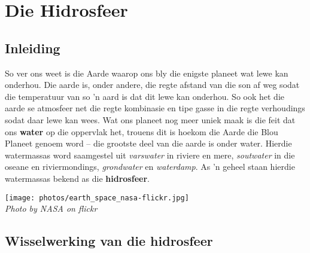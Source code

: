          \chapter{Die Hidrosfeer}

    \section{Inleiding}
            \nopagebreak
\begin{minipage}{.7\textwidth}
So ver ons weet is die Aarde waarop ons bly die enigste planeet wat lewe kan onderhou. Die aarde is, onder andere, die regte afstand van die son af weg sodat die temperatuur van so  'n aard is dat dit lewe kan onderhou. So ook het die aarde se atmosfeer net die regte kombinasie en tipe gasse in die regte verhoudings sodat daar lewe kan wees. Wat ons planeet nog meer uniek maak is die feit dat ons \textbf{water} op die oppervlak het, trouens dit is hoekom die Aarde die Blou Planeet genoem word – die grootste deel van die aarde is onder water. Hierdie watermassas word saamgestel uit \textsl{varswater} in riviere en mere, \textsl{soutwater} in die oseane en riviermondings, \textsl{grondwater} en \textsl{waterdamp}. As  'n geheel staan hierdie watermassas bekend as die \textbf{hidrosfeer}.
\end{minipage}
\begin{minipage}{.3\textwidth}
\begin{center}
 \texttt{[image: photos/earth\_space\_nasa-flickr.jpg]}\\
\textsl{Photo by NASA on flickr}
\end{center}

\end{minipage}


\section{Wisselwerking van die hidrosfeer}
            \nopagebreak

